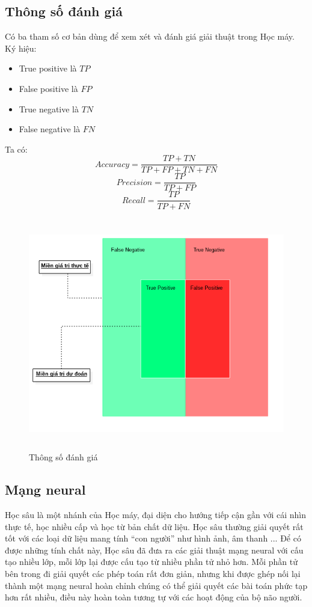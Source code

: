 \subsection{Thông số đánh giá}
Có ba tham số cơ bản dùng để xem xét và đánh giá giải thuật trong Học máy.
Ký hiệu:
\begin{itemize}
\item True positive là $TP$
\item False positive là $FP$
\item True negative là $TN$
\item False negative là $FN$
\end{itemize}
Ta có:
\[
  Accuracy = \frac{TP+TN}{TP+FP+TN+FN}
\]
\[
  Precision = \frac{TP}{TP+FP}
\]
\[
  Recall = \frac{TP}{TP+FN}
\]
\begin{figure}[h!]
\centering
\includegraphics[height=4in, keepaspectratio=true]{precision_recall.png}
\caption{Thông số đánh giá}
\end{figure}
\subsection{Mạng neural}
Học sâu là một nhánh của Học máy, đại diện cho hướng tiếp cận gần với cái nhìn 
thực tế, học nhiều cấp và học từ bản chất dữ liệu. Học sâu thường giải quyết 
rất tốt với các loại dữ liệu mang tính ``con người'' như hình ảnh, âm thanh ... 
Để có được những tính chất này, Học sâu đã đưa ra các giải thuật mạng neural 
với cấu tạo nhiều lớp, mỗi lớp lại được cấu tạo từ nhiều phần tử nhỏ hơn. Mỗi 
phần tử bên trong đi giải quyết các phép toán rất đơn giản, nhưng khi được ghép 
nối lại thành một mạng neural hoàn chỉnh chúng có thể giải quyết các bài toán 
phức tạp hơn rất nhiều, điều này hoàn toàn tương tự với các hoạt động của bộ 
não người. \cite{NeuralNetworksandDeepLearning} 
